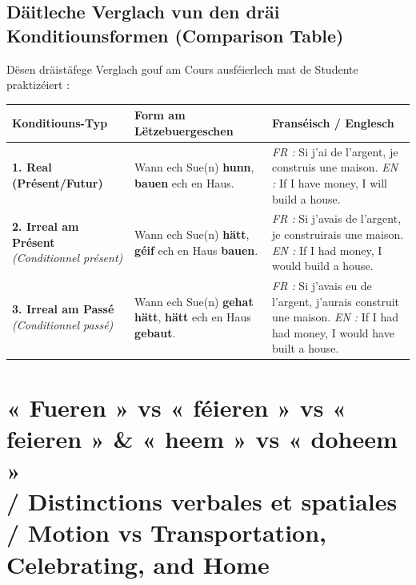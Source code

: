 \subsection*{Däitleche Verglach vun den dräi Konditiounsformen (Comparison Table)}

Dësen dräistäfege Verglach gouf am Cours ausféierlech mat de Studente praktizéiert :

\begin{center}
\small
\begin{tabular}{p{3.5cm} p{5.0cm} p{6.5cm}}
\toprule
\textbf{Konditiouns-Typ} & \textbf{Form am Lëtzebuergeschen} & \textbf{Franséisch / Englesch} \\
\midrule
\textbf{1. Real (Présent/Futur)} & Wann ech Sue(n) \textbf{hunn}, \textbf{bauen} ech en Haus. & \textit{FR :} Si j'ai de l'argent, je construis une maison. \newline \textit{EN :} If I have money, I will build a house. \\
\midrule
\textbf{2. Irreal am Présent} \newline \textit{(Conditionnel présent)} & Wann ech Sue(n) \textbf{hätt}, \textbf{géif} ech en Haus \textbf{bauen}. & \textit{FR :} Si j'avais de l'argent, je construirais une maison. \newline \textit{EN :} If I had money, I would build a house. \\
\midrule
\textbf{3. Irreal am Passé} \newline \textit{(Conditionnel passé)} & Wann ech Sue(n) \textbf{gehat hätt}, \textbf{hätt} ech en Haus \textbf{gebaut}. & \textit{FR :} Si j'avais eu de l'argent, j'aurais construit une maison. \newline \textit{EN :} If I had had money, I would have built a house. \\
\bottomrule
\end{tabular}
\end{center}

\vspace{1.5em}

\section[Fueren vs féieren vs feieren / Verbs of Motion and Celebrating]{« Fueren » vs « féieren » vs « feieren » \& « heem » vs « doheem » \\/ Distinctions verbales et spatiales \\/ Motion vs Transportation, Celebrating, and Home}

